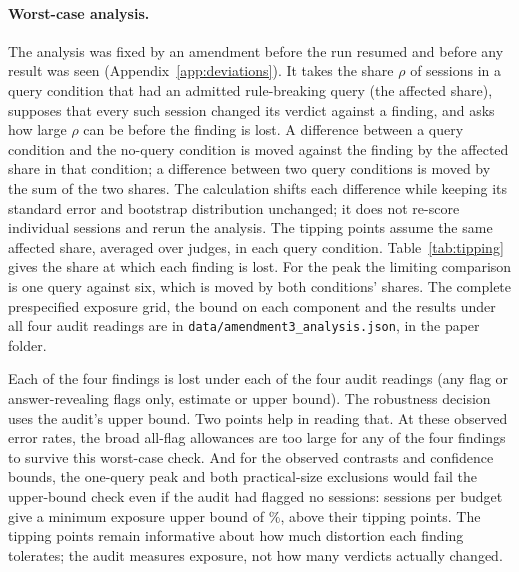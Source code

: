 \begin{table}[h]
\centering
\caption{Gate audit: share of sampled sessions with a flagged admitted query. Upper bounds are nominal one-sided
95\% Clopper-Pearson bounds on the pooled counts. Coverage can fall slightly below 95\% when judges differ; the
bounds are not simultaneous and do not account for labelling error.}
\label{tab:gateaudit}
\small

\end{table}

\paragraph{Worst-case analysis.} The analysis was fixed by an amendment before the run resumed and before any result
was seen (Appendix~\ref{app:deviations}). It takes the share $\rho$ of sessions in a query condition
that had an admitted rule-breaking query (the affected share), supposes that every such session changed its verdict
against a finding, and asks how large $\rho$ can be before the finding is lost. A difference between a query
condition and the no-query condition is moved against the finding by the affected share in that condition; a
difference between two query conditions is moved by the sum of the two shares. The calculation shifts each
difference while keeping its standard error and bootstrap distribution unchanged; it does not re-score individual
sessions and rerun the analysis. The tipping points assume the same affected share, averaged over judges, in each
query condition. Table~\ref{tab:tipping} gives the share at which each finding is lost. For the peak the limiting
comparison is one query against six, which is moved by both conditions' shares. The complete prespecified exposure
grid, the bound on each component and the results under all four audit readings are in
\texttt{data/amendment3\_analysis.json}, in the paper folder.

Each of the four findings is lost under each of the four audit readings (any flag or answer-revealing flags only,
estimate or upper bound). The robustness decision uses the audit's upper bound. Two points help in reading that. At these observed error rates, the broad all-flag
allowances are too large for any of the four findings to survive this worst-case check. And for the observed
contrasts and confidence bounds, the one-query peak and both practical-size exclusions would fail the upper-bound
check even if the audit had flagged no sessions: \nAuditPerBudget{} sessions per budget give a minimum exposure upper
bound of \auditZeroFlagBound\%, above their tipping points. The tipping points remain informative about how much
distortion each finding tolerates; the audit measures exposure, not how many verdicts actually changed.

